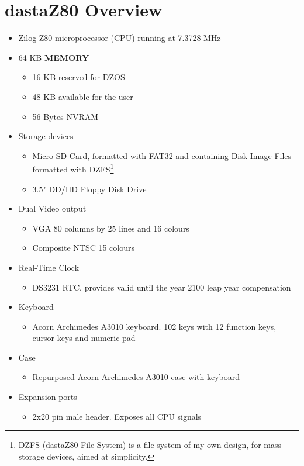 \documentclass[a4paper,11pt]{article}
\begin{document}
    \section{dastaZ80 Overview}
    \begin{itemize}
        \item Zilog Z80 microprocessor (CPU) running at 7.3728 MHz
        \item 64 KB \textbf{MEMORY}
        \begin{itemize}
            \item 16 KB reserved for DZOS
            \item 48 KB available for the user
            \item 56 Bytes NVRAM
        \end{itemize}
        \item Storage devices
        \begin{itemize}
            \item Micro SD Card, formatted with FAT32 and containing Disk Image
            Files formatted with DZFS\footnote{DZFS (dastaZ80 File System) is a
            file system of my own design, for mass storage devices, aimed at
            simplicity.}
            \item 3.5" DD/HD Floppy Disk Drive
        \end{itemize}
        \item Dual Video output
        \begin{itemize}
            \item VGA 80 columns by 25 lines and 16 colours
            \item Composite NTSC 15 colours
        \end{itemize}
        \item Real-Time Clock
        \begin{itemize}
            \item DS3231 RTC, provides valid until the year 2100 leap year
            compensation
        \end{itemize}
        \item Keyboard
        \begin{itemize}
            \item Acorn Archimedes A3010 keyboard. 102 keys with 12 function
            keys, cursor keys and numeric pad
        \end{itemize}
        \item Case
        \begin{itemize}
            \item Repurposed Acorn Archimedes A3010 case with keyboard
        \end{itemize}
        \item Expansion ports
        \begin{itemize}
            \item 2x20 pin male header. Exposes all CPU signals
        \end{itemize}
    \end{itemize}
\end{document}

